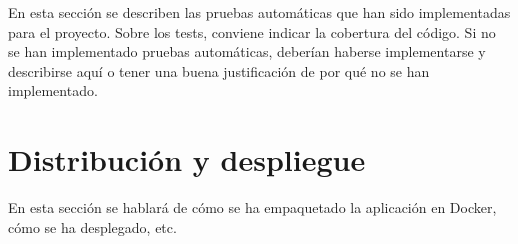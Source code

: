 En esta sección se describen las pruebas automáticas que han sido implementadas para el proyecto. Sobre los tests, conviene indicar la cobertura del código. Si no se han implementado pruebas automáticas, deberían haberse implementarse y describirse aquí o tener una buena justificación de por qué no se han implementado.

\section{Distribución y despliegue} 

En esta sección se hablará de cómo se ha empaquetado la aplicación en Docker, cómo se ha desplegado, etc.
